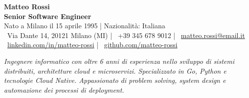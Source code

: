\documentclass[10pt,a4paper]{article}
\begin{document}
\begin{center}
  {\Huge\bfseries\color{accent} Matteo Rossi} \\
  \vspace{0.4em}
  {\large\bfseries\color{lighttext} Senior Software Engineer} \\
  \vspace{0.8em}
  \small
  Nato a Milano il 15 aprile 1995 \quad | \quad Nazionalità: Italiana \\
  \vspace{0.4em}
  \faMapMarker\ Via Dante 14, 20121 Milano (MI) \quad | \quad
  \faPhone\ +39 345 678 9012 \quad | \quad
  \faEnvelope\ \href{mailto:matteo.rossi@email.it}{matteo.rossi@email.it} \\
  \vspace{0.4em}
  \faLinkedin\ \href{https://linkedin.com/in/matteo-rossi-fictional}{linkedin.com/in/matteo-rossi} \quad | \quad
  \faGithub\ \href{https://github.com/matteo-rossi-fictional}{github.com/matteo-rossi}
\end{center}

\vspace{0.5em}
\noindent\textit{Ingegnere informatico con oltre 6 anni di esperienza nello sviluppo di sistemi distribuiti, architetture cloud e microservizi. Specializzato in Go, Python e tecnologie Cloud Native. Appassionato di problem solving, system design e automazione dei processi di deployment.}
\vspace{0.8em}
\end{document}
